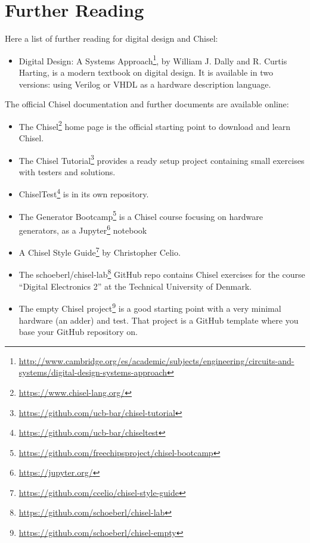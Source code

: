 \documentclass[%
    10pt,
    headinclude, footexclude,
    openright, %
    notitlepage,
    cleardoubleempty,
    headsepline,
    pointlessnumbers,
    bibtotoc, idxtotoc,
    ]{scrbook}
\newcommand{\myref}[2]{\href{#1}{#2}}
\renewcommand{\myref}[2]{{#2}{\footnote{\url{#1}}}}
\begin{document}
\section{Further Reading}

Here a list of further reading for digital design and Chisel:
\begin{itemize}
\item \myref{http://www.cambridge.org/es/academic/subjects/engineering/circuits-and-systems/digital-design-systems-approach}{Digital Design: A Systems Approach}, by William J. Dally and R. Curtis Harting,
is a modern textbook on digital design. It is available in two versions: using Verilog or VHDL as a hardware description language.
\end{itemize}

The official Chisel documentation and further documents are available online:

\begin{itemize}
\item The \myref{https://www.chisel-lang.org/}{Chisel} home page is the official starting point to
download and learn Chisel.
\item The \myref{https://github.com/ucb-bar/chisel-tutorial}{Chisel Tutorial} provides a ready setup
project containing small exercises with testers and solutions.

\item \myref{https://github.com/ucb-bar/chiseltest}{ChiselTest} is in
its own repository.
\item The \myref{https://github.com/freechipsproject/chisel-bootcamp}{Generator Bootcamp} is
a Chisel course focusing on hardware generators, as a \myref{https://jupyter.org/}{Jupyter} notebook
\item A \myref{https://github.com/ccelio/chisel-style-guide}{Chisel Style Guide} by Christopher Celio.
\item The \myref{https://github.com/schoeberl/chisel-lab}{schoeberl/chisel-lab} GitHub repo
contains Chisel exercises for the course ``Digital Electronics 2'' at the Technical University of Denmark.
\item The \myref{https://github.com/schoeberl/chisel-empty}{empty Chisel project} is a good starting
point with a very minimal hardware (an adder) and test. That project is a GitHub template where you
base your GitHub repository on.
\end{itemize}
\end{document}
